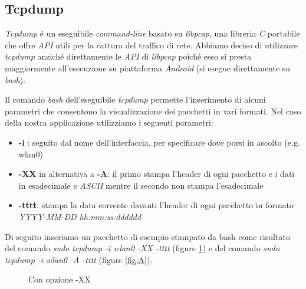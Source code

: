 \documentclass[12pt]{article} %
\begin{document}

\subsection{Tcpdump} %

\textit{Tcpdump} \'e un eseguibile \textit{command-line} basato su \textit{libpcap}, una libreria \textit{C} portabile che offre \textit{API} utili per la cattura del traffico di rete. Abbiamo deciso di utilizzare \textit{tcpdump} anzich\'e direttamente le \textit{API} di \textit{libpcap} poich\'e esso si presta maggiormente all'esecuzione su piattaforma \textit{Android} (si esegue direttamente su \textit{bash}).

Il comando \textit{bash} dell'eseguibile \textit{tcpdump} permette l'inserimento di alcuni parametri che consentono la visualizzazione dei pacchetti in vari formati. Nel caso della nostra applicazione utilizziamo i seguenti parametri:

\begin{itemize}
\item \textbf{-i} : seguito dal nome dell'interfaccia, per specificare dove porsi in ascolto (e.g. wlan0)
\item \textbf{-XX} in alternativa a \textbf{-A}: il primo stampa l'header di ogni pacchetto e i dati in esadecimale e \textit{ASCII} mentre il secondo non stampa l'esadecimale
\item \textbf{-tttt}: stampa la data corrente davanti l'header di ogni pacchetto in formato \textit{YYYY-MM-DD hh:mm:ss:dddddd}
\end{itemize}

Di seguito inseriamo un pacchetto di esempio stampato da bash come risultato del comando \textit{sudo tcpdump -i wlan0 -XX -tttt} (figure \ref{fig:XX}) e del comando \textit{sudo tcpdump -i wlan0 -A -tttt} (figure \ref{fig:A}).

\begin{figure}[H] %
\caption{Con opzione -XX}\label{fig:XX}
\end{figure}
\end{document}
